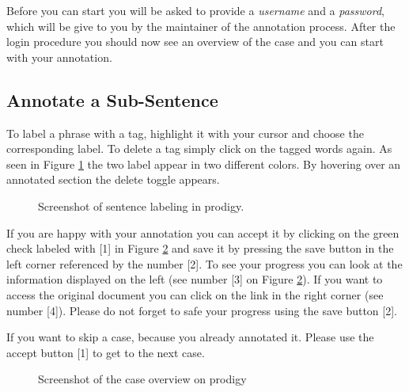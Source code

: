 \documentclass{article}
\begin{document}
Before you can start you will be asked to provide a \emph{username} and a \emph{password}, which will be give to you by the maintainer of the annotation process. After the login procedure you should now see an overview of the case and you can start with your annotation.

\subsection{Annotate a Sub-Sentence}
To label a phrase with a tag, highlight it with your cursor and choose the corresponding label. To delete a tag simply click on the tagged words again. As seen in Figure \ref{sentence_annotation} the two label appear in two different colors. By hovering over an annotated section the delete toggle appears.

\begin{figure}[h]
     \caption{Screenshot of sentence labeling in prodigy.}
     \label{sentence_annotation}
\end{figure}


If you are happy with your annotation you can accept it by clicking on the green check labeled with [1] in Figure \ref{overview} and save it by pressing the save button in the left corner referenced by the number [2].
To see your progress you can look at the information displayed on the left (see number [3] on Figure \ref{overview}). If you want to access the original document you can click on the link in the right corner (see number [4]). Please do not forget to safe your progress using the save button [2].

If you want to skip a case, because you already annotated it. Please use the accept button [1] to get to the next case.

\begin{figure}[h]
     \caption{Screenshot of the case overview on prodigy}
     \label{overview}
\end{figure}
\pagebreak
\end{document}
